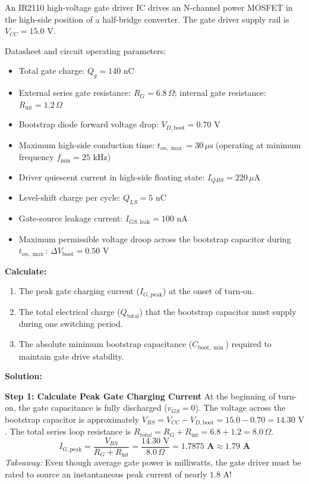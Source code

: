 \documentclass[11pt,a4paper]{article}
\begin{document}
\begin{examplebox}
An IR2110 high-voltage gate driver IC drives an N-channel power MOSFET in the high-side position of a half-bridge converter. The gate driver supply rail is $V_{CC} = 15.0\text{ V}$.

Datasheet and circuit operating parameters:
\begin{itemize}[leftmargin=*]
  \item Total gate charge: $Q_g = 140\text{ nC}$
  \item External series gate resistance: $R_G = 6.8\,\Omega$; internal gate resistance: $R_{\text{int}} = 1.2\,\Omega$
  \item Bootstrap diode forward voltage drop: $V_{D,\text{boot}} = 0.70\text{ V}$
  \item Maximum high-side conduction time: $t_{on,\max} = 30\,\mu\text{s}$ (operating at minimum frequency $f_{\min} = 25\text{ kHz}$)
  \item Driver quiescent current in high-side floating state: $I_{QBS} = 220\,\mu\text{A}$
  \item Level-shift charge per cycle: $Q_{LS} = 5\text{ nC}$
  \item Gate-source leakage current: $I_{GS,\text{leak}} = 100\text{ nA}$
  \item Maximum permissible voltage droop across the bootstrap capacitor during $t_{on,\max}$: $\Delta V_{\text{boot}} = 0.50\text{ V}$
\end{itemize}

\textbf{Calculate:}
\begin{enumerate}[label=(\alph*)]
  \item The peak gate charging current ($I_{G,\text{peak}}$) at the onset of turn-on.
  \item The total electrical charge ($Q_{\text{total}}$) that the bootstrap capacitor must supply during one switching period.
  \item The absolute minimum bootstrap capacitance ($C_{\text{boot},\min}$) required to maintain gate drive stability.
\end{enumerate}

\tcblower
\textbf{Solution:}

\textbf{Step 1: Calculate Peak Gate Charging Current}
At the beginning of turn-on, the gate capacitance is fully discharged ($v_{GS} = 0$). The voltage across the bootstrap capacitor is approximately $V_{BS} = V_{CC} - V_{D,\text{boot}} = 15.0 - 0.70 = 14.30\text{ V}$.
The total series loop resistance is $R_{total} = R_G + R_{\text{int}} = 6.8 + 1.2 = 8.0\,\Omega$.
\begin{equation}
I_{G,\text{peak}} = \frac{V_{BS}}{R_G + R_{\text{int}}} = \frac{14.30\text{ V}}{8.0\,\Omega} = \mathbf{1.7875\text{ A}} \approx \mathbf{1.79\text{ A}}
\end{equation}
\textit{Takeaway:} Even though average gate power is milliwatts, the gate driver must be rated to source an instantaneous peak current of nearly \textbf{$1.8\text{ A}$}!


\end{examplebox}
\end{document}
